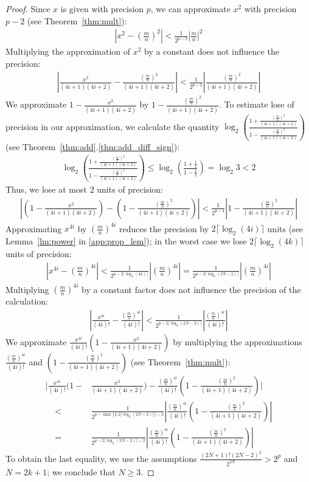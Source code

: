 \documentclass{article}
\numberwithin{mytheorem}{section}
\begin{document}
\begin{proof}
Since $x$ is given with precision $p$, we can approximate $x^2$ with precision $p-2$ (see Theorem~\ref{thm:mult}): 
\begin{align*}
|x^2-(\frac{m}{n})^2|<\frac{1}{2^{p-2}}|\frac{m}{n}|^2
\end{align*}
Multiplying the approximation of $x^2$ by a constant does not influence the precision:
\begin{align*}
|\frac{x^2}{(4i+1)(4i+2)}-\frac{(\frac{m}{n})^2}{(4i+1)(4i+2)}|<\frac{1}{2^{p-2}}|\frac{(\frac{m}{n})^2}{(4i+1)(4i+2)}|
\end{align*}
We approximate $1-\frac{x^2}{(4i+1)(4i+2)}$ by $1-\frac{(\frac{m}{n})^2}{(4i+1)(4i+2)}$. To estimate lose of precision in our approximation, we calculate the quantity $\log_2(\frac{1+\frac{(\frac{m}{n})^2}{(4i+1)(4i+2)}}{1-\frac{(\frac{m}{n})^2}{(4i+1)(4i+2)}})$ (see Theorem~\ref{thm:add}.\ref{thm:add_diff_sign}):
\begin{align*}
\log_2(\frac{1+\frac{(\frac{m}{n})^2}{(4i+1)(4i+2)}}{1-\frac{(\frac{m}{n})^2}{(4i+1)(4i+2)}})\leq \log_2(\frac{1+\frac{1}{2}}{1-\frac{1}{2}})=\log_2 3<2
\end{align*}
Thus, we lose at most $2$ units of precision:
\begin{align*}
|(1-\frac{x^2}{(4i+1)(4i+2)})-(1-\frac{(\frac{m}{n})^2}{(4i+1)(4i+2)})|<\frac{1}{2^{p-4}}|1-\frac{(\frac{m}{n})^2}{(4i+1)(4i+2)}|
\end{align*}
Approximating $x^{4i}$ by $(\frac{m}{n})^{4i}$ reduces the precision by $2\lceil\log_2 (4i) \rceil$ units (see Lemma~\ref{lm:power} in \ref{app:prop_lem}); in the worst case we lose $2\lceil\log_2 (4k) \rceil$ units of precision:
\begin{align*}
|x^{4i}-(\frac{m}{n})^{4i}|<\frac{1}{2^{p-2\lceil\log_2 (4k) \rceil}}|(\frac{m}{n})^{4i}|=\frac{1}{2^{p-2\lceil\log_2 (2N-2) \rceil}}|(\frac{m}{n})^{4i}|
\end{align*}
Multiplying $(\frac{m}{n})^{4i}$ by a constant factor does not influence the precision of the calculation: 
\begin{align*}
|\frac{x^{4i}}{(4i)!}-\frac{(\frac{m}{n})^{4i}}{(4i)!}|<\frac{1}{2^{p-2\lceil\log_2 (2N-2) \rceil}}|\frac{(\frac{m}{n})^{4i}}{(4i)!}|
\end{align*}
We approximate $\frac{x^{4i}}{(4i)!}(1-\frac{x^2}{(4i+1)(4i+2)})$ by multiplying the approximations $\frac{(\frac{m}{n})^{4i}}{(4i)!}$ and $(1-\frac{(\frac{m}{n})^2}{(4i+1)(4i+2)})$ (see Theorem~\ref{thm:mult}):
\begin{align*}
|\frac{x^{4i}}{(4i)!}(1-&\frac{x^2}{(4i+1)(4i+2)})-\frac{(\frac{m}{n})^{4i}}{(4i)!}(1-\frac{(\frac{m}{n})^2}{(4i+1)(4i+2)})|\\
~~~~~<&\frac{1}{2^{p-\max\{4,2\lceil\log_2(2N-2)\rceil\}-2}}|\frac{(\frac{m}{n})^{4i}}{(4i)!}(1-\frac{(\frac{m}{n})^2}{(4i+1)(4i+2)})|\\
~~~~~= &\frac{1}{2^{p-2\lceil\log_2(2N-2)\rceil-2}}|\frac{(\frac{m}{n})^{4i}}{(4i)!}(1-\frac{(\frac{m}{n})^2}{(4i+1)(4i+2)})|
\end{align*}
To obtain the last equality, we use the assumptions $\frac{(2N+1)!(2N-2)^2}{2^{2N}}>2^p$ and $N=2k+1$; we conclude that $N\geq 3$.


\end{proof}
\end{document}
